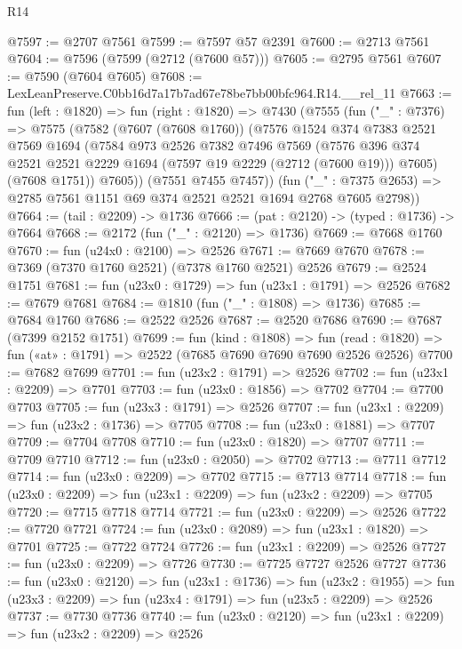 \begin{lexlean}{R14}
\begin{coremodule}
@7597 := @2707 @7561
@7599 := @7597 @57 @2391
@7600 := @2713 @7561
@7604 := @7596 (@7599 (@2712 (@7600 @57)))
@7605 := @2795 @7561
@7607 := @7590 (@7604 @7605)
@7608 := LexLeanPreserve.C0bb16d7a17b7ad67e78be7bb00bfc964.R14.__rel_11
@7663 := fun (left : @1820) =>
  fun (right : @1820) =>
  @7430
    (@7555
      (fun ("_" : @7376) =>
      @7575
        (@7582
          (@7607 (@7608 @1760))
          (@7576
            @1524
            @374
            @7383
            @2521
            @7569
            @1694
            (@7584
              @973
              @2526
              @7382
              @7496
              @7569
              (@7576 @396 @374 @2521 @2521 @2229 @1694 (@7597 @19 @2229 (@2712 (@7600 @19))) @7605)
              (@7608 @1751))
            @7605))
        (@7551 @7455 @7457))
      (fun ("_" : @7375 @2653) => @2785 @7561 @1151 @69 @374 @2521 @2521 @1694 @2768 @7605 @2798))
@7664 := (tail : @2209) -> @1736
@7666 := (pat : @2120) -> (typed : @1736) -> @7664
@7668 := @2172 (fun ("_" : @2120) => @1736)
@7669 := @7668 @1760
@7670 := fun (u24x0 : @2100) => @2526
@7671 := @7669 @7670
@7678 := @7369 (@7370 @1760 @2521) (@7378 @1760 @2521) @2526
@7679 := @2524 @1751
@7681 := fun (u23x0 : @1729) => fun (u23x1 : @1791) => @2526
@7682 := @7679 @7681
@7684 := @1810 (fun ("_" : @1808) => @1736)
@7685 := @7684 @1760
@7686 := @2522 @2526
@7687 := @2520 @7686
@7690 := @7687 (@7399 @2152 @1751)
@7699 := fun (kind : @1808) =>
  fun (read : @1820) => fun («at» : @1791) => @2522 (@7685 @7690 @7690 @7690 @2526 @2526)
@7700 := @7682 @7699
@7701 := fun (u23x2 : @1791) => @2526
@7702 := fun (u23x1 : @2209) => @7701
@7703 := fun (u23x0 : @1856) => @7702
@7704 := @7700 @7703
@7705 := fun (u23x3 : @1791) => @2526
@7707 := fun (u23x1 : @2209) => fun (u23x2 : @1736) => @7705
@7708 := fun (u23x0 : @1881) => @7707
@7709 := @7704 @7708
@7710 := fun (u23x0 : @1820) => @7707
@7711 := @7709 @7710
@7712 := fun (u23x0 : @2050) => @7702
@7713 := @7711 @7712
@7714 := fun (u23x0 : @2209) => @7702
@7715 := @7713 @7714
@7718 := fun (u23x0 : @2209) => fun (u23x1 : @2209) => fun (u23x2 : @2209) => @7705
@7720 := @7715 @7718 @7714
@7721 := fun (u23x0 : @2209) => @2526
@7722 := @7720 @7721
@7724 := fun (u23x0 : @2089) => fun (u23x1 : @1820) => @7701
@7725 := @7722 @7724
@7726 := fun (u23x1 : @2209) => @2526
@7727 := fun (u23x0 : @2209) => @7726
@7730 := @7725 @7727 @2526 @7727
@7736 := fun (u23x0 : @2120) =>
  fun (u23x1 : @1736) =>
  fun (u23x2 : @1955) => fun (u23x3 : @2209) => fun (u23x4 : @1791) => fun (u23x5 : @2209) => @2526
@7737 := @7730 @7736
@7740 := fun (u23x0 : @2120) => fun (u23x1 : @2209) => fun (u23x2 : @2209) => @2526

\end{coremodule}
\end{lexlean}
